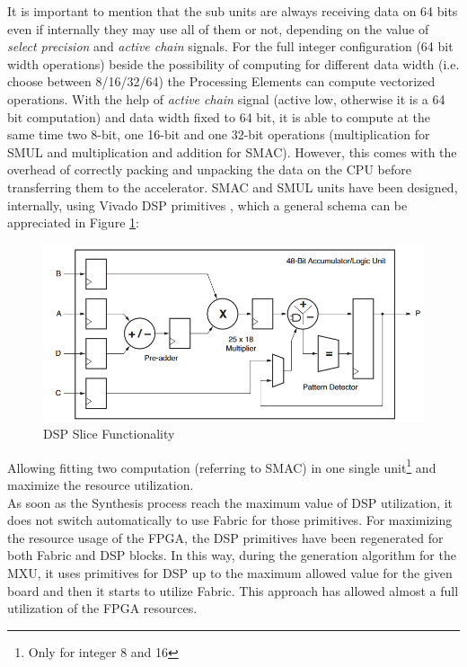 It is important to mention that the sub units are always receiving data on 64 bits even if internally they may use all of them or not, depending on the value of \textit{select precision} and \textit{active chain} signals. For the full integer configuration (64 bit width operations) beside the possibility of computing for different data width (i.e. choose between 8/16/32/64) the Processing Elements can compute vectorized operations. With the help of \textit{active chain} signal (active low, otherwise it is a 64 bit computation) and data width fixed to 64 bit, it is able to compute at the same time two 8-bit, one 16-bit and one 32-bit operations (multiplication for SMUL and multiplication and addition for SMAC).
However, this comes with the overhead of correctly packing and unpacking the data on the CPU before transferring them to the accelerator.
\newpage
SMAC and SMUL units have been designed, internally, using Vivado DSP primitives \cite{paper:48}, which a general schema can be appreciated in Figure \ref{fig:dsp}:
\begin{figure}[H]
\centering
\captionsetup{justification=centering}
\includegraphics[scale=0.5,angle=0]{./figure/vivado_dsp.png}
\caption{DSP Slice Functionality \cite{paper:48}}
\label{fig:dsp}
\end{figure} 
Allowing fitting two computation (referring to SMAC) in one single unit\footnote{Only for integer 8 and 16} and maximize the resource utilization.\\

As soon as the Synthesis process reach the maximum value of DSP utilization, it does not switch automatically to use Fabric for those primitives. For maximizing the resource usage of the FPGA, the DSP primitives have been regenerated for both Fabric and DSP blocks. In this way, during the generation algorithm for the MXU, it uses primitives for DSP up to the maximum allowed value for the given board and then it starts to utilize Fabric.
This approach has allowed almost a full utilization of the FPGA resources.
